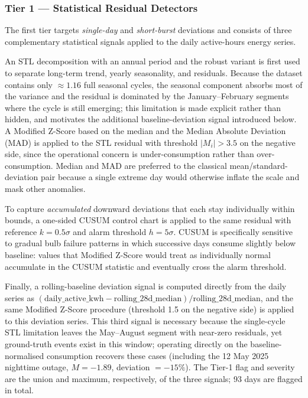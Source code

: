 \documentclass{article}
\begin{document}
\subsubsection{Tier 1 --- Statistical Residual Detectors}

The first tier targets \emph{single-day} and \emph{short-burst} deviations and consists of three complementary statistical signals applied to the daily active-hours energy series.

An STL decomposition \cite{cleveland1990stl} with an annual period and the robust variant is first used to separate long-term trend, yearly seasonality, and residuals. Because the dataset contains only $\approx\!1.16$ full seasonal cycles, the seasonal component absorbs most of the variance and the residual is dominated by the January--February segments where the cycle is still emerging; this limitation is made explicit rather than hidden, and motivates the additional baseline-deviation signal introduced below. A Modified Z-Score \cite{iglewicz1993outliers} based on the median and the Median Absolute Deviation (MAD) is applied to the STL residual with threshold $|M_i|>3.5$ on the negative side, since the operational concern is under-consumption rather than over-consumption. Median and MAD are preferred to the classical mean/standard-deviation pair because a single extreme day would otherwise inflate the scale and mask other anomalies.

To capture \emph{accumulated} downward deviations that each stay individually within bounds, a one-sided CUSUM control chart \cite{page1954cusum} is applied to the same residual with reference $k=0.5\sigma$ and alarm threshold $h=5\sigma$. CUSUM is specifically sensitive to gradual bulb failure patterns in which successive days consume slightly below baseline: values that Modified Z-Score would treat as individually normal accumulate in the CUSUM statistic and eventually cross the alarm threshold.

Finally, a rolling-baseline deviation signal is computed directly from the daily series as $(\text{daily\_active\_kwh}-\text{rolling\_28d\_median})/\text{rolling\_28d\_median}$, and the same Modified Z-Score procedure (threshold 1.5 on the negative side) is applied to this deviation series. This third signal is necessary because the single-cycle STL limitation leaves the May--August segment with near-zero residuals, yet ground-truth events exist in this window; operating directly on the baseline-normalised consumption recovers these cases (including the 12 May 2025 nighttime outage, $M=-1.89$, deviation $=-15\%$). The Tier-1 flag and severity are the union and maximum, respectively, of the three signals; 93 days are flagged in total.
\end{document}
